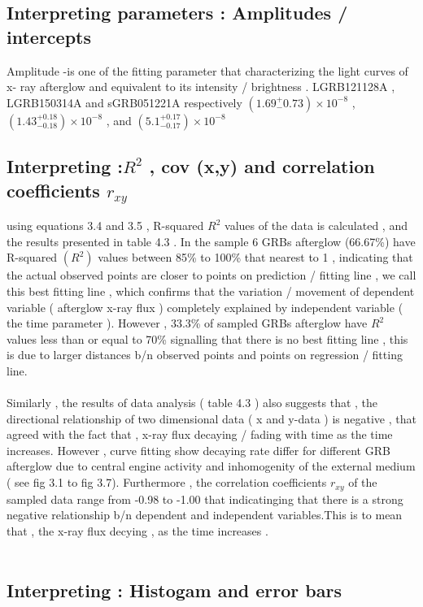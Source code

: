 \subsection{Interpreting  parameters : Amplitudes / intercepts}
 Amplitude -is  one  of  the  fitting  parameter   that  characterizing   the  light curves  of  x- ray afterglow  and   equivalent  to  its  intensity / brightness . LGRB121128A  , LGRB150314A  and   sGRB051221A   respectively   $ ( 1.69 ^{+}_{-}0.73 ) \times10^{-8} $ , $ ( 1.43^{+0.18}_{-0.18} )\times10^{-8}$  ,  and  $ ( 5.1^{+0.17}_{-0.17})\times10^{-8} $  
\subsection{Interpreting :$ R^{2} $ , cov (x,y) and correlation  coefficients $ r_{xy} $ } 
using  equations  3.4  and 3.5 ,  R-squared $ R^{2} $ values  of the data  is  calculated ,  and  the  results  presented  in  table 4.3 . In  the  sample   6  GRBs afterglow  (66.67\%)  have  R-squared  $(R^{2})$  values  between 85\%  to  100\%  that   nearest  to   1 ,  indicating  that  the  actual  observed  points  are  closer  to  points   on   prediction  / fitting   line , we  call  this  best fitting  line , which  confirms that   the   variation / movement   of  dependent  variable  (  afterglow  x-ray  flux )  completely  explained  by  independent  variable  ( the  time  parameter ). However , 33.3\%  of  sampled  GRBs  afterglow  have $ R^{2} $  values  less than  or equal  to  70\%  signalling  that  there is no  best   fitting  line  ,  this  is  due  to   larger  distances   b/n   observed  points  and  points  on  regression / fitting   line. \\\\
Similarly , the  results  of  data  analysis  ( table 4.3 ) also  suggests  that  , the  directional  relationship  of  two  dimensional  data  ( x and  y-data )   is negative , that    agreed   with  the  fact  that , x-ray  flux  decaying / fading  with   time   as  the  time  increases.  However ,  curve  fitting  show  decaying rate  differ  for  different   GRB  afterglow  due  to  central  engine  activity  and  inhomogenity  of  the  external  medium ( see  fig 3.1  to  fig 3.7).   
Furthermore ,  the  correlation  coefficients  $ r_{xy} $  of   the  sampled  data   range  from   -0.98  to    -1.00   that   indicatinging   that  there  is  a strong  negative  relationship   b/n  dependent  and  independent  variables.This is  to mean  that , the   x-ray flux decying , as the  time  increases .\\\\
\subsection{Interpreting : Histogam  and   error bars}
